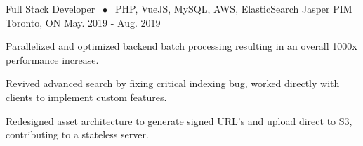 \begin{cventries}
  \cventry
  {Full Stack Developer $\;\bullet\;$ PHP, VueJS, MySQL, AWS, ElasticSearch} %
    {Jasper PIM} %
    {Toronto, ON} %
    {May. 2019 - Aug. 2019} %
    {
      \begin{cvitems} %
      \item {Parallelized and optimized backend batch processing resulting in an overall 1000x performance increase.}
      \item {Revived advanced search by fixing critical indexing bug, worked directly with clients to implement custom features.}
      \item {Redesigned asset architecture to generate signed URL's and upload direct to S3, contributing to a stateless server.}
      \end{cvitems}
    }

\end{cventries}
